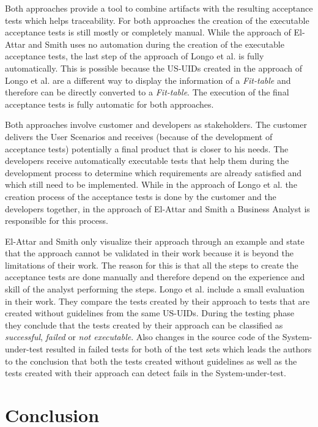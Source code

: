 Both approaches provide a tool to combine artifacts with the resulting acceptance tests which helps traceability.
For both approaches the creation of the executable acceptance tests is still mostly or completely manual.
While the approach of El-Attar and Smith uses no automation during the creation of the executable acceptance tests, the last step of the approach of Longo et al. is fully automatically.
This is possible because the US-UIDs created in the approach of Longo et al. are a different way to display the information of a \textit{Fit-table} and therefore can be directly converted to a \textit{Fit-table}.
The execution of the final acceptance tests is fully automatic for both approaches.

Both approaches involve customer and developers as stakeholders.
The customer delivers the User Scenarios and receives (because of the development of acceptance tests) potentially a final product that is closer to his needs.
The developers receive automatically executable tests that help them during the development process to determine which requirements are already satisfied and which still need to be implemented.
While in the approach of Longo et al. the creation process of the acceptance tests is done by the customer and the developers together, in the approach of El-Attar and Smith a Business Analyst is responsible for this process.

El-Attar and Smith only visualize their approach through an example and state that the approach cannot be validated in their work because it is beyond the limitations of their work.
The reason for this is that all the steps to create the acceptance tests are done manually and therefore depend on the experience and skill of the analyst performing the steps.
Longo et al. include a small evaluation in their work.
They compare the tests created by their approach to tests that are created without guidelines from the same US-UIDs.
During the testing phase they conclude that the tests created by their approach can be classified as \textit{successful}, \textit{failed} or \textit{not executable}.
Also changes in the source code of the System-under-test resulted in failed tests for both of the test sets which leads the authors to the conclusion that both the tests created without guidelines as well as the tests created with their approach can detect fails in the System-under-test.


\section{Conclusion}
\label{sec:topic_2_conclusion}

